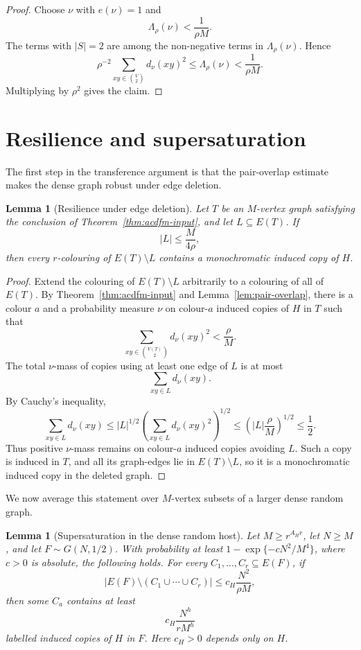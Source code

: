 \documentclass[11pt,reqno]{amsart}
\numberwithin{equation}{section}
\theoremstyle{plain}
\newtheorem{lemma}[theorem]{Lemma}
\theoremstyle{definition}
\begin{document}
\begin{proof}
Choose $\nu$ with $e(\nu)=1$ and
$$
        \Lambda_\rho(\nu)<\frac{1}{\rho M}.
$$
The terms with $|S|=2$ are among the non-negative terms in
$\Lambda_\rho(\nu)$.  Hence
$$
        \rho^{-2}\sum_{xy\in\binom V2}d_\nu(xy)^2
        \le \Lambda_\rho(\nu)
        <\frac{1}{\rho M}.
$$
Multiplying by $\rho^2$ gives the claim.
\end{proof}

\section{Resilience and supersaturation}

The first step in the transference argument is that the pair-overlap estimate
makes the dense graph robust under edge deletion.

\begin{lemma}[Resilience under edge deletion]
\label{lem:resilience}
Let $T$ be an $M$-vertex graph satisfying the conclusion of
Theorem~\ref{thm:acdfm-input}, and let $L\subseteq E(T)$.  If
$$
        |L|\le \frac{M}{4\rho},
$$
then every $r$-colouring of $E(T)\setminus L$ contains a monochromatic
induced copy of $H$.
\end{lemma}

\begin{proof}
Extend the colouring of $E(T)\setminus L$ arbitrarily to a colouring of all
of $E(T)$.  By Theorem~\ref{thm:acdfm-input} and Lemma~\ref{lem:pair-overlap}, there is
a colour $a$ and a probability measure $\nu$ on colour-$a$ induced copies
of $H$ in $T$ such that
$$
        \sum_{xy\in\binom{V(T)}2}d_\nu(xy)^2<\frac{\rho}{M}.
$$
The total $\nu$-mass of copies using at least one edge of $L$ is at most
$$
        \sum_{xy\in L}d_\nu(xy).
$$
By Cauchy's inequality,
$$
        \sum_{xy\in L}d_\nu(xy)
        \le |L|^{1/2}
        \left(\sum_{xy\in L}d_\nu(xy)^2\right)^{1/2}
        \le \left(|L|\frac{\rho}{M}\right)^{1/2}
        \le \frac12.
$$
Thus positive $\nu$-mass remains on colour-$a$ induced copies avoiding
$L$.  Such a copy is induced in $T$, and all its graph-edges lie in
$E(T)\setminus L$, so it is a monochromatic induced copy in the deleted
graph.
\end{proof}

We now average this statement over $M$-vertex subsets of a larger dense
random graph.

\begin{lemma}[Supersaturation in the dense random host]
\label{lem:supersaturation}
Let $M\ge r^{A_Hr}$, let $N\ge M$, and let $F\sim G(N,1/2)$.  With
probability at least $1-\exp\{-cN^2/M^4\}$, 
where $c>0$ is absolute, the following holds.  For every
$C_1,\ldots,C_r\subseteq E(F)$, if
$$
        |E(F)\setminus(C_1\cup\cdots\cup C_r)|
        \le c_H\frac{N^2}{\rho M},
$$
then some $C_a$ contains at least
$$
        c_H\frac{N^h}{rM^h}
$$
labelled induced copies of $H$ in $F$.  Here $c_H>0$ depends only on
$H$.
\end{lemma}
\end{document}
